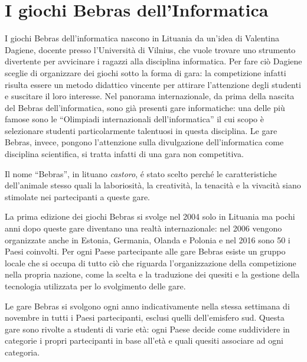 \documentclass[12pt]{report}
\begin{document}
\chapter{I giochi Bebras dell'Informatica}
\label{cap1}
I giochi Bebras dell'informatica nascono in Lituania da un'idea di Valentina Dagiene, docente presso l'Università di Vilnius, che vuole trovare uno strumento divertente per avvicinare i ragazzi alla disciplina informatica. Per fare ciò Dagiene sceglie di organizzare dei giochi sotto la forma di gara: la competizione infatti risulta essere un metodo didattico vincente per attirare l'attenzione degli studenti e suscitare il loro interesse. Nel panorama internazionale, da prima della nascita del Bebras dell'informatica, sono già presenti gare informatiche: una delle più famose sono le ``Olimpiadi internazionali dell'informatica'' il cui scopo è selezionare studenti particolarmente talentuosi in questa disciplina. Le gare Bebras, invece, pongono l'attenzione sulla divulgazione dell'informatica come disciplina scientifica, si tratta infatti di una gara non competitiva.

Il nome ``Bebras'', in lituano \textit{castoro}, é stato scelto perché le caratteristiche dell'animale stesso quali la laboriosità, la creatività, la tenacità e la vivacità siano stimolate nei partecipanti a queste gare.

La prima edizione dei giochi Bebras si svolge nel 2004 solo in Lituania ma pochi anni dopo queste gare diventano una realtà internazionale: nel 2006 vengono organizzate anche in Estonia, Germania, Olanda e Polonia e nel 2016 sono 50 i Paesi coinvolti.
Per ogni Paese partecipante alle gare Bebras esiste un gruppo locale che si occupa di tutto ciò che riguarda l'organizzazione della competizione nella propria nazione, come la scelta e la traduzione dei quesiti e la gestione della tecnologia utilizzata per lo svolgimento delle gare.

Le gare Bebras si svolgono ogni anno indicativamente nella stessa settimana di novembre in tutti i Paesi partecipanti, esclusi quelli dell'emisfero sud. 
Questa gare sono rivolte a studenti di varie età: ogni Paese decide come suddividere in categorie i propri partecipanti in base all'età e quali quesiti associare ad ogni categoria.
\end{document}

